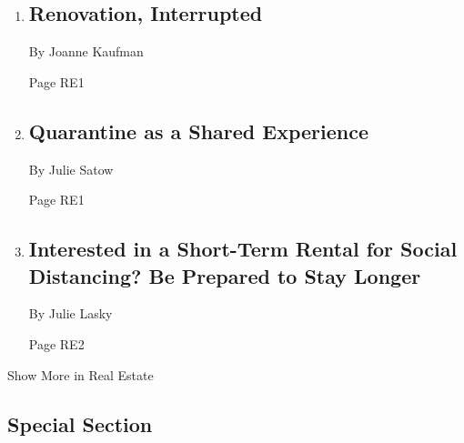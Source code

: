 \begin{enumerate}
\def\labelenumi{\arabic{enumi}.}
\item
  \href{/2020/04/17/realestate/coronavirus-renovations-stopped.html}{}

  \hypertarget{renovation-interrupted}{%
  \subsection{Renovation, Interrupted}\label{renovation-interrupted}}

  By Joanne Kaufman

  Page RE1
\item
  \href{/2020/04/13/realestate/coronavirus-quarantine-as-a-shared-experience.html}{}

  \hypertarget{quarantine-as-a-shared-experience}{%
  \subsection{Quarantine as a Shared
  Experience}\label{quarantine-as-a-shared-experience}}

  By Julie Satow

  Page RE1
\item
  \href{/2020/04/16/realestate/coronavirus-short-term-rentals.html}{}

  \hypertarget{interested-in-a-short-term-rental-for-social-distancing-be-prepared-to-stay-longer}{%
  \subsection{Interested in a Short-Term Rental for Social Distancing?
  Be Prepared to Stay
  Longer}\label{interested-in-a-short-term-rental-for-social-distancing-be-prepared-to-stay-longer}}

  By Julie Lasky

  Page RE2
\end{enumerate}

Show More in Real Estate

\hypertarget{special-section}{%
\subsection{Special Section}\label{special-section}}

